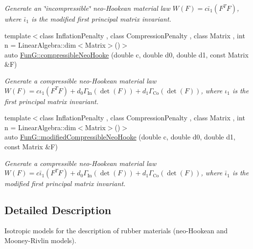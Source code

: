 \begin{DoxyCompactItemize}
\begin{DoxyCompactList}\small\item\em \-Generate an \char`\"{}incompressible\char`\"{} neo-\/\-Hookean material law $ W(F)=c\bar\iota_1(F^T F) $, where $\bar\iota_1$ is the modified first principal matrix invariant. \end{DoxyCompactList}\item 
{\footnotesize template$<$class Inflation\-Penalty , class Compression\-Penalty , class Matrix , int n = \-Linear\-Algebra\-::dim$<$\-Matrix$>$()$>$ }\\auto \hyperlink{group__Rubber_gac5c39cd9de55f4f0220a806cf28a7b30}{\-Fun\-G\-::compressible\-Neo\-Hooke} (double c, double d0, double d1, const \-Matrix \&\-F)
\begin{DoxyCompactList}\small\item\em \-Generate a compressible neo-\/\-Hookean material law $ W(F)=c\iota_1(F^T F)+d_0\Gamma_\mathrm{In}(\det(F))+d_1\Gamma_\mathrm{Co}(\det(F)) $, where $\iota_1$ is the first principal matrix invariant. \end{DoxyCompactList}\item 
{\footnotesize template$<$class Inflation\-Penalty , class Compression\-Penalty , class Matrix , int n = \-Linear\-Algebra\-::dim$<$\-Matrix$>$()$>$ }\\auto \hyperlink{group__Rubber_gac10942df03f037afdf0a81d330361a6b}{\-Fun\-G\-::modified\-Compressible\-Neo\-Hooke} (double c, double d0, double d1, const \-Matrix \&\-F)
\begin{DoxyCompactList}\small\item\em \-Generate a compressible neo-\/\-Hookean material law $ W(F)=c\bar\iota_1(F^T F)+d_0\Gamma_\mathrm{In}(\det(F))+d_1\Gamma_\mathrm{Co}(\det(F)) $, where $\bar\iota_1$ is the modified first principal matrix invariant. \end{DoxyCompactList}\end{DoxyCompactItemize}


\subsection{\-Detailed \-Description}
\-Isotropic models for the description of rubber materials (neo-\/\-Hookean and \-Mooney-\/\-Rivlin models). 

